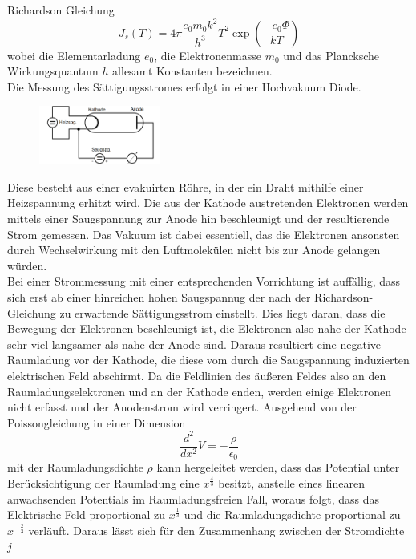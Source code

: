 Richardson Gleichung
\begin{equation}
    \label{eq:richardson}
J_s(T)=4\pi\frac{e_0m_0k^2}{h^3}T^2\exp(\frac{-e_0\Phi}{kT})
\end{equation}
wobei die Elementarladung $e_0$, die Elektronenmasse $m_0$ und das Plancksche Wirkungsquantum $h$ allesamt Konstanten bezeichnen. \\
Die Messung des Sättigungsstromes erfolgt in einer Hochvakuum Diode.
\begin{figure}[h]
    \centering
    \includegraphics[width=4cm, keepaspectratio]{Hochvakuum-Diode}
    \label{Drehimpuls}
  \end{figure}
Diese besteht aus einer evakuirten Röhre, in der ein Draht mithilfe einer
Heizspannung erhitzt wird. Die aus der Kathode austretenden Elektronen werden mittels einer Saugspannung zur Anode hin beschleunigt
und der resultierende Strom gemessen. Das Vakuum ist dabei essentiell, das die Elektronen ansonsten durch Wechselwirkung mit den Luftmolekülen nicht 
bis zur Anode gelangen würden. \\
Bei einer Strommessung mit einer entsprechenden Vorrichtung ist auffällig, dass sich erst ab einer hinreichen hohen Saugspannug 
der nach der Richardson-Gleichung zu erwartende Sättigungsstrom einstellt. Dies liegt daran, dass die Bewegung der Elektronen beschleunigt ist,
die Elektronen also nahe der Kathode sehr viel langsamer als nahe der Anode sind. Daraus resultiert eine negative Raumladung vor der Kathode,
die diese vom durch die Saugspannung induzierten elektrischen Feld abschirmt. Da die Feldlinien des äußeren Feldes also an den Raumladungselektronen 
und an der Kathode enden, werden einige Elektronen nicht erfasst und der Anodenstrom wird verringert.
Ausgehend von der Poissongleichung in einer Dimension 
\begin{equation}
\frac{d^2}{dx^2}V=-\frac{\rho}{\epsilon_0}
\end{equation}
mit der Raumladungsdichte $\rho$ kann hergeleitet werden, dass das Potential unter Berücksichtigung der Raumladung eine $x^{\frac{4}{3}}$ besitzt, 
anstelle eines linearen anwachsenden Potentials im Raumladungsfreien Fall, woraus folgt, dass das Elektrische Feld proportional zu $x^{\frac{1}{3}}$
und die Raumladungsdichte proportional zu $x^{-\frac{2}{3}}$ verläuft. Daraus lässt sich für den Zusammenhang zwischen der Stromdichte $j$ 
